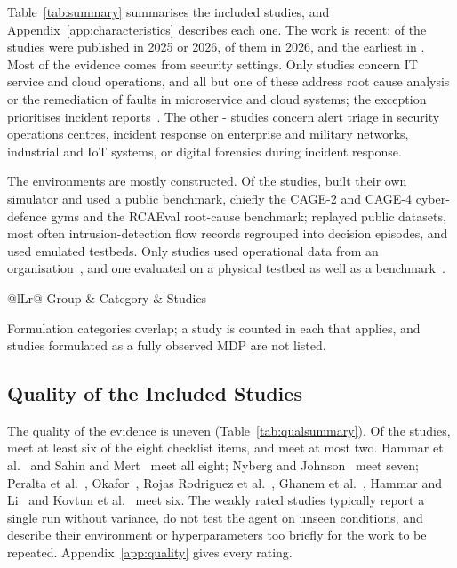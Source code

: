 Table~\ref{tab:summary} summarises the \NIncluded{} included studies, and Appendix~\ref{app:characteristics} describes each one. The work is recent: \NYearRecent{} of the \NIncluded{} studies were published in 2025 or 2026, \NYearTwentySix{} of them in 2026, and the earliest in \NYearMin. Most of the evidence comes from security settings. Only \NSetITOPS{} studies concern IT service and cloud operations, and all but one of these address root cause analysis or the remediation of faults in microservice and cloud systems; the exception prioritises incident reports~\cite{peralta2025}. The other \the\numexpr\NIncluded-\NSetITOPS\relax{} studies concern alert triage in security operations centres, incident response on enterprise and military networks, industrial and IoT systems, or digital forensics during incident response.

The environments are mostly constructed. Of the \NIncluded{} studies, \NEnvSim{} built their own simulator and \NEnvBench{} used a public benchmark, chiefly the CAGE-2 and CAGE-4 cyber-defence gyms and the RCAEval root-cause benchmark; \NEnvData{} replayed public datasets, most often intrusion-detection flow records regrouped into decision episodes, and \NEnvEmu{} used emulated testbeds. Only \NEnvOps{} studies used operational data from an organisation~\cite{peralta2025,wang2023hrlhf,ding2023}, and one evaluated on a physical testbed as well as a benchmark~\cite{hammar2026belief}.

\begin{table}[!t]
\centering
\caption{Characteristics of the Included Studies}
\label{tab:summary}
\footnotesize
\begin{tabularx}{\columnwidth}{@{}lLr@{}}
\toprule
Group & Category & Studies \\
\midrule
{}
\bottomrule
\end{tabularx}
\vspace{2pt}

\raggedright\footnotesize Formulation categories overlap; a study is counted in each that applies, and studies formulated as a fully observed MDP are not listed.
\end{table}

\subsection{Quality of the Included Studies}

The quality of the evidence is uneven (Table~\ref{tab:qualsummary}). Of the \NIncluded{} studies, \NQHigh{} meet at least six of the eight checklist items, and \NQLow{} meet at most two. Hammar et al.~\cite{hammar2026belief} and Sahin and Mert~\cite{sahin2026} meet all eight; Nyberg and Johnson~\cite{nyberg2024} meet seven; Peralta et al.~\cite{peralta2025}, Okafor~\cite{okafor2026}, Rojas Rodriguez et al.~\cite{rojasrodriguez2026}, Ghanem et al.~\cite{ghanem2026}, Hammar and Li~\cite{hammar2025} and Kovtun et al.~\cite{kovtun2026} meet six. The weakly rated studies typically report a single run without variance, do not test the agent on unseen conditions, and describe their environment or hyperparameters too briefly for the work to be repeated. Appendix~\ref{app:quality} gives every rating.

